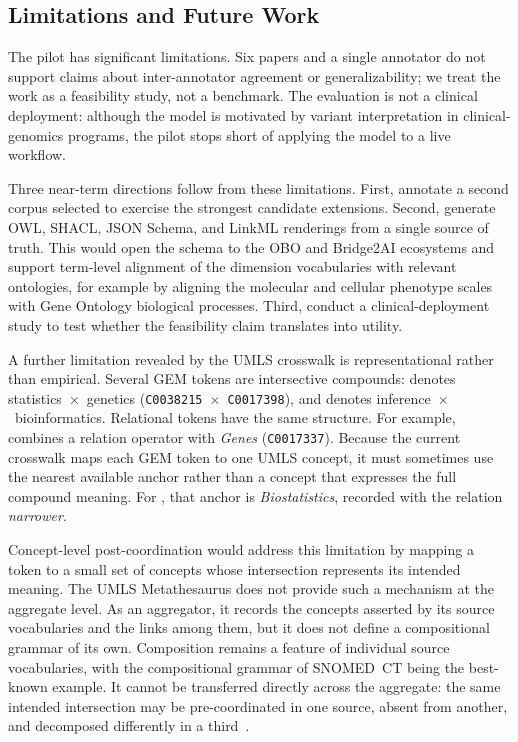 \subsection{Limitations and Future Work}
\label{sec:disc-limitations}
\label{sec:disc-future}

The pilot has significant limitations. Six papers and a single
annotator do not support claims about inter-annotator agreement or
generalizability; we treat the work as a feasibility study, not a
benchmark. The evaluation is not a clinical
deployment: although the model is motivated by variant
interpretation in clinical-genomics programs, the pilot stops short
of applying the model to a live workflow.

Three near-term directions follow from these limitations. First, annotate a
second corpus selected to exercise the strongest candidate extensions.
Second, generate OWL, SHACL, JSON Schema, and LinkML renderings from a
single source of truth. This would open the schema to the OBO and Bridge2AI
ecosystems and support term-level alignment of the dimension vocabularies
with relevant ontologies, for example by aligning the molecular and cellular
phenotype scales with Gene Ontology biological processes. Third, conduct a
clinical-deployment study to test whether the feasibility claim translates
into utility.

A further limitation revealed by the UMLS crosswalk is representational
rather than empirical. Several GEM tokens are intersective compounds:
 denotes statistics~$\times$~genetics
(\texttt{C0038215}~$\times$~\texttt{C0017398}), and
 denotes inference~$\times$~bioinformatics.
Relational tokens have the same structure. For example,
 combines a relation operator with \emph{Genes}
(\texttt{C0017337}). Because the current crosswalk maps each GEM token to
one UMLS concept, it must sometimes use the nearest available anchor rather
than a concept that expresses the full compound meaning. For
, that anchor is \emph{Biostatistics},
recorded with the relation \emph{narrower}.

Concept-level post-coordination would address this limitation by mapping a
token to a small set of concepts whose intersection represents its intended
meaning. The UMLS Metathesaurus does not provide such a mechanism at the
aggregate level. As an aggregator, it records the concepts asserted by its
source vocabularies and the links among them, but it does not define a
compositional grammar of its own. Composition remains a feature of individual
source vocabularies, with the compositional grammar of SNOMED~CT being the
best-known example. It cannot be transferred directly across the aggregate:
the same intended intersection may be pre-coordinated in one source, absent
from another, and decomposed differently in a third~\cite{umls2004}.

